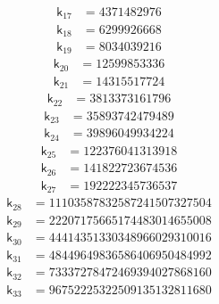 \[
\begin{aligned}
\mathsf{k}_{17} &={} 4371482976
\end{aligned}
\]
\[
\begin{aligned}
\mathsf{k}_{18} &={} 6299926668
\end{aligned}
\]
\[
\begin{aligned}
\mathsf{k}_{19} &={} 8034039216
\end{aligned}
\]
\[
\begin{aligned}
\mathsf{k}_{20} &={} 12599853336
\end{aligned}
\]
\[
\begin{aligned}
\mathsf{k}_{21} &={} 14315517724
\end{aligned}
\]
\[
\begin{aligned}
\mathsf{k}_{22} &={} 3813373161796
\end{aligned}
\]
\[
\begin{aligned}
\mathsf{k}_{23} &={} 35893742479489
\end{aligned}
\]
\[
\begin{aligned}
\mathsf{k}_{24} &={} 39896049934224
\end{aligned}
\]
\[
\begin{aligned}
\mathsf{k}_{25} &={} 122376041313918
\end{aligned}
\]
\[
\begin{aligned}
\mathsf{k}_{26} &={} 141822723674536
\end{aligned}
\]
\[
\begin{aligned}
\mathsf{k}_{27} &={} 192222345736537
\end{aligned}
\]
\[
\begin{aligned}
\mathsf{k}_{28} &={} 11103587832587241507327504
\end{aligned}
\]
\[
\begin{aligned}
\mathsf{k}_{29} &={} 22207175665174483014655008
\end{aligned}
\]
\[
\begin{aligned}
\mathsf{k}_{30} &={} 44414351330348966029310016
\end{aligned}
\]
\[
\begin{aligned}
\mathsf{k}_{31} &={} 48449649836586406950484992
\end{aligned}
\]
\[
\begin{aligned}
\mathsf{k}_{32} &={} 73337278472469394027868160
\end{aligned}
\]
\[
\begin{aligned}
\mathsf{k}_{33} &={} 96752225322509135132811680
\end{aligned}
\]
